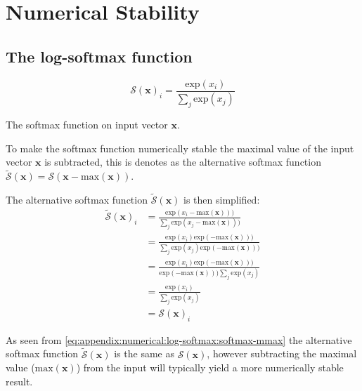 \chapter{Numerical Stability}

\section{The log-softmax function}
\label{appendix:numerical-stability:log-softmax}

\begin{equationbox}[H]
\begin{equation*}
\mathcal{S}(\mathbf{x})_i = \frac{\mathrm{exp}(x_i)}{\sum_j \mathrm{exp}(x_j)}
\end{equation*}
\caption{The softmax function on input vector $\mathbf{x}$.}
\end{equationbox}

To make the softmax function numerically stable the maximal value of the input vector $\mathbf{x}$ is subtracted, this is denotes as the alternative softmax function $\tilde{\mathcal{S}}(\mathbf{x}) = \mathcal{S}(\mathbf{x} - \mathrm{max}(\mathbf{x}))$.

The alternative softmax function $\tilde{\mathcal{S}}(\mathbf{x})$ is then simplified:
\begin{equation}
\begin{aligned}
\tilde{\mathcal{S}}(\mathbf{x})_i
&= \frac{\mathrm{exp}(x_i - \mathrm{max}(\mathbf{x})))}{\sum_j \mathrm{exp}(x_j - \mathrm{max}(\mathbf{x})))} \\
&= \frac{\mathrm{exp}(x_i)\mathrm{exp}(- \mathrm{max}(\mathbf{x})))}{\sum_j \mathrm{exp}(x_j)\mathrm{exp}(- \mathrm{max}(\mathbf{x})))} \\
&= \frac{\mathrm{exp}(x_i)\mathrm{exp}(- \mathrm{max}(\mathbf{x})))}{\mathrm{exp}(- \mathrm{max}(\mathbf{x}))) \sum_j \mathrm{exp}(x_j)} \\
&= \frac{\mathrm{exp}(x_i)}{\sum_j \mathrm{exp}(x_j)} \\
&= \mathcal{S}(\mathbf{x})_i
\end{aligned}
\label{eq:appendix:numerical:log-softmax:softmax-mmax}
\end{equation}

As seen from \eqref{eq:appendix:numerical:log-softmax:softmax-mmax} the alternative softmax function $\tilde{\mathcal{S}}(\mathbf{x})$ is the same as $\mathcal{S}(\mathbf{x})$, however subtracting the maximal value ($\mathrm{max}(\mathbf{x})$) from the input will typically yield a more numerically stable result. 

